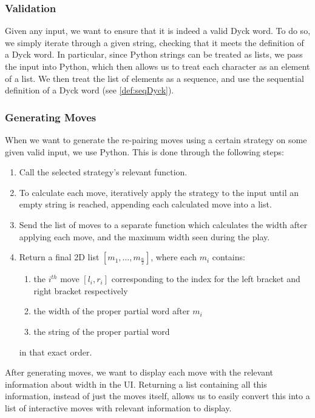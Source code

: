 \subsubsection{Validation}
Given any input, we want to ensure that it is indeed a valid Dyck word. To do so, we simply iterate through a given string, checking that it meets the definition of a Dyck word. In particular, since Python strings can be treated as lists, we pass the input into Python, which then allows us to treat each character as an element of a list. We then treat the list of elements as a sequence, and use the sequential definition of a Dyck word (see \autoref{def:seqDyck}). 

\subsubsection{Generating Moves}
When we want to generate the re-pairing moves using a certain strategy on some given valid input, we use Python. This is done through the following steps:
\begin{enumerate}
    \item Call the selected strategy's relevant function.
    \item To calculate each move, iteratively apply the strategy to the input until an empty string is reached, appending each calculated move into a list.
    \item Send the list of moves to a separate function which calculates the width after applying each move, and the maximum width seen during the play.
    \item Return a final 2D list $[m_{1}, \dots, m_{\frac{n}{2}}]$, where each $m_{i}$ contains: 
    \begin{enumerate}
        \item the $i^{th}$ move $[l_{i}, r_{i}]$ corresponding to the index for the left bracket and right bracket respectively
        \item the width of the proper partial word after $m_{i}$
        \item the string of the proper partial word
    \end{enumerate}
    in that exact order.
\end{enumerate}
After generating moves, we want to display each move with the relevant information about width in the UI. Returning a list containing all this information, instead of just the moves itself, allows us to easily convert this into a list of interactive moves with relevant information to display.

